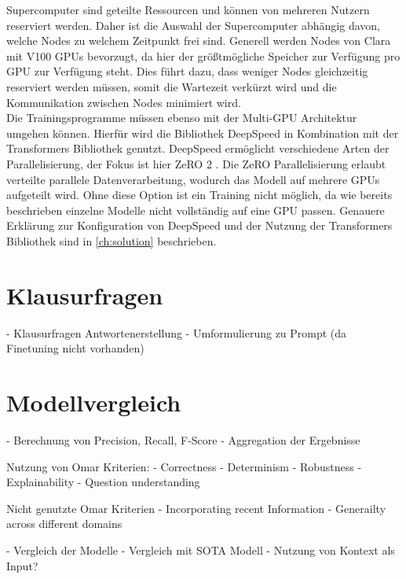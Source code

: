 Supercomputer sind geteilte Ressourcen und können von mehreren Nutzern reserviert werden.
Daher ist die Auswahl der Supercomputer abhängig davon, welche Nodes zu welchem Zeitpunkt frei sind.
Generell werden Nodes von Clara mit V100 GPUs bevorzugt, da hier der größtmögliche Speicher zur Verfügung pro GPU zur Verfügung steht.
Dies führt dazu, dass weniger Nodes gleichzeitig reserviert werden müssen, somit die Wartezeit verkürzt wird und die Kommunikation zwischen Nodes minimiert wird.\\

Die Trainingsprogramme müssen ebenso mit der Multi-GPU Architektur umgehen können.
Hierfür wird die Bibliothek DeepSpeed \citep{deepspeed} in Kombination mit der Transformers Bibliothek genutzt. %
DeepSpeed ermöglicht verschiedene Arten der Parallelisierung, der Fokus ist hier ZeRO 2 \citep{ZeRO}. Die ZeRO Parallelisierung erlaubt verteilte parallele Datenverarbeitung, wodurch das Modell auf mehrere GPUs aufgeteilt wird. %
Ohne diese Option ist ein Training nicht möglich, da wie bereits beschrieben einzelne Modelle nicht vollständig auf eine GPU passen.
Genauere Erklärung zur Konfiguration von DeepSpeed und der Nutzung der Transformers Bibliothek sind in \ref{ch:solution} beschrieben.

\section{Klausurfragen}
- Klausurfragen Antwortenerstellung
- Umformulierung zu Prompt (da Finetuning nicht vorhanden)

\section{Modellvergleich}
- Berechnung von Precision, Recall, F-Score
- Aggregation der Ergebnisse

Nutzung von Omar Kriterien:
    - Correctness
    - Determinism
    - Robustness
    - Explainability
    - Question understanding

Nicht genutzte Omar Kriterien
    - Incorporating recent Information
    - Generailty across different domains
    
- Vergleich der Modelle
- Vergleich mit SOTA Modell
    - Nutzung von Kontext als Input?

